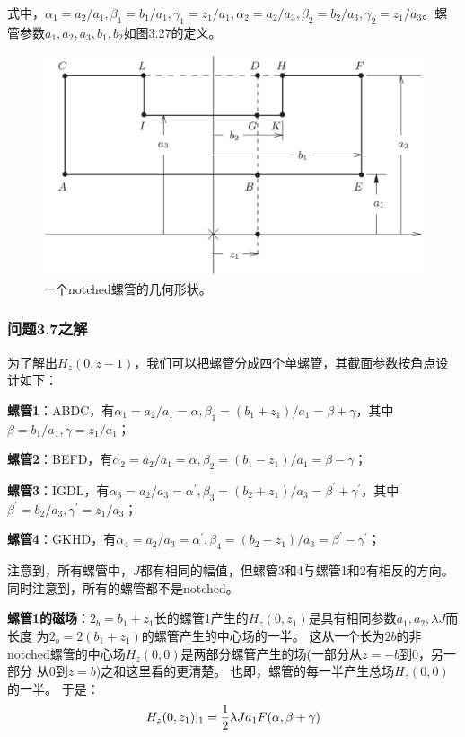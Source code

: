 式中，$\alpha_1=a_2/a_1,\beta_1=b_1/a_1,\gamma_1=z_1/a_1,\alpha_2=a_2/a_3,\beta_2=b_2/a_3,\gamma_2=z_1/a_3$。螺管参数$a_1, a_2, a_3, b_1, b_2$如图3.27的定义。
\begin{figure}[htbp]
	\centering
	\includegraphics[scale=0.4]{chpt3/figs/fig3.27.eps}
	\caption{一个notched螺管的几何形状。}
\end{figure}


\subsubsection{问题3.7之解}
为了解出$H_z(0,z-1)$，我们可以把螺管分成四个单螺管，其截面参数按角点设计如下：

\textbf{螺管1}：ABDC，有$\alpha_1=a_2/a_1=\alpha,\beta_1=(b_1+z_1)/a_1=\beta+\gamma$，其中
$\beta=b_1/a_1,\gamma=z_1/a_1$；

\textbf{螺管2}：BEFD，有$\alpha_2=a_2/a_1=\alpha,\beta_2=(b_1-z_1)/a_1=\beta-\gamma$；

\textbf{螺管3}：IGDL，有$\alpha_3=a_2/a_3=\alpha^\prime,\beta_3=(b_2+z_1)/a_3=\beta^\prime+\gamma^\prime$，其中$\beta^\prime=b_2/a_3,\gamma^\prime=z_1/a_3$；

\textbf{螺管4}：GKHD，有$\alpha_4=a_2/a_3=\alpha^\prime,\beta_4=(b_2-z_1)/a_3=\beta^\prime-\gamma^\prime$；

注意到，所有螺管中，$J$都有相同的幅值，但螺管3和4与螺管1和2有相反的方向。同时注意到，所有的螺管都不是notched。

\textbf{螺管1的磁场}：$2_b=b_1+z_1$长的螺管1产生的$H_z(0, z_1)$是具有相同参数$a_1, a_2,\lambda J$而长度
为$2_b = 2(b_1+z_1)$的螺管产生的中心场的一半。
这从一个长为$2b$的非notched螺管的中心场$H_z(0, 0)$是两部分螺管产生的场(一部分从$z=−b$到$0$，另一部分
从$0$到$z=b$)之和这里看的更清楚。
也即，螺管的每一半产生总场$H_z(0, 0)$的一半。 于是：
\begin{equation}
H_{z}(0,z_{1})|_{1}=\frac{1}{2}\lambda Ja_{1}F(\alpha,\beta+\gamma)\\%
\end{equation}

